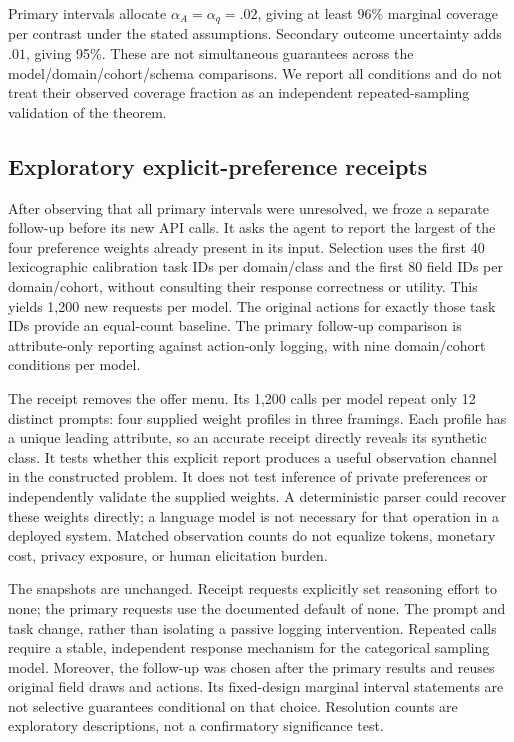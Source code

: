 \documentclass[10pt,twocolumn]{article}
\theoremstyle{definition}\newtheorem{definition}[theorem]{Definition}
\newcommand{\1}{\mathbf 1}
\begin{document}
Primary intervals allocate $\alpha_A=\alpha_q=.02$, giving at least 96\% marginal coverage per contrast under the stated assumptions. Secondary outcome uncertainty adds $.01$, giving 95\%. These are not simultaneous guarantees across the model/domain/cohort/schema comparisons. We report all conditions and do not treat their observed coverage fraction as an independent repeated-sampling validation of the theorem.

\subsection{Exploratory explicit-preference receipts}
After observing that all primary intervals were unresolved, we froze a separate follow-up before its new API calls. It asks the agent to report the largest of the four preference weights already present in its input. Selection uses the first 40 lexicographic calibration task IDs per domain/class and the first 80 field IDs per domain/cohort, without consulting their response correctness or utility. This yields 1,200 new requests per model. The original actions for exactly those task IDs provide an equal-count baseline. The primary follow-up comparison is attribute-only reporting against action-only logging, with nine domain/cohort conditions per model.

The receipt removes the offer menu. Its 1,200 calls per model repeat only 12 distinct prompts: four supplied weight profiles in three framings. Each profile has a unique leading attribute, so an accurate receipt directly reveals its synthetic class. It tests whether this explicit report produces a useful observation channel in the constructed problem. It does not test inference of private preferences or independently validate the supplied weights. A deterministic parser could recover these weights directly; a language model is not necessary for that operation in a deployed system. Matched observation counts do not equalize tokens, monetary cost, privacy exposure, or human elicitation burden.

The snapshots are unchanged. Receipt requests explicitly set reasoning effort to none; the primary requests use the documented default of none. The prompt and task change, rather than isolating a passive logging intervention. Repeated calls require a stable, independent response mechanism for the categorical sampling model. Moreover, the follow-up was chosen after the primary results and reuses original field draws and actions. Its fixed-design marginal interval statements are not selective guarantees conditional on that choice. Resolution counts are exploratory descriptions, not a confirmatory significance test.
\end{document}
